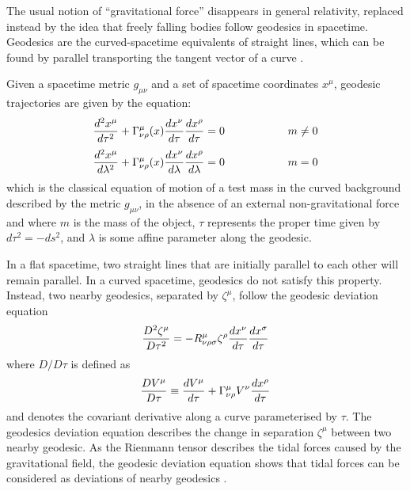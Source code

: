 \documentclass[binding=0.6cm, LaM]{sapthesis}
\begin{document}
	The usual notion of “gravitational force” disappears in general relativity, replaced instead 
	by the idea that freely falling bodies follow geodesics in spacetime.
	Geodesics are the curved-spacetime equivalents of straight lines, which can be found by 
	parallel transporting the tangent vector of a curve \cite{16}.

	Given a spacetime metric $g_{\mu\nu}$ and a set of spacetime coordinates $x^{\mu}$, 
	geodesic trajectories are given by the equation:
		\begin{equation}
			{{d^2x^{\mu}}\over{d\tau^2}} + \Gamma_{\nu\rho}^{\mu}(x){{dx^{\nu}}\over{d\tau}}{{dx^{\rho}}\over{d\tau}} = 0 \hspace*{2cm} m \neq 0
		\end{equation}
		\begin{equation}
			{{d^2x^{\mu}}\over{d\lambda^2}} + \Gamma_{\nu\rho}^{\mu}(x){{dx^{\nu}}\over{d\lambda}}{{dx^{\rho}}\over{d\lambda}} = 0 \hspace*{2cm} m = 0
		\end{equation}
	which is the classical equation of motion of a test mass in the curved background described 
	by the metric $g_{\mu\nu}$, in the absence of an external non-gravitational force and where $m$ is the mass
	of the object, $\tau$ represents the proper time given by $d\tau^2 = -ds^2$, 
	and $\lambda$ is some affine parameter along the geodesic.

	In a flat spacetime, two straight lines that are initially parallel to each other will remain parallel.
	In a curved spacetime, geodesics do not satisfy this property.
	Instead, two nearby geodesics, separated by $\zeta^{\mu}$, follow the geodesic deviation equation
		\begin{equation}
			{{D^2\zeta^{\mu}}\over{D\tau^2}} = -R^{\mu}_{\nu\rho\sigma}\zeta^{\rho}{{dx^{\nu}}\over{d\tau}}{{dx^{\sigma}}\over{d\tau}}
		\end{equation}
	where $D/D\tau$ is defined as
		\begin{equation}
			{{DV^{\mu}}\over{D\tau}} \equiv {{dV^{\mu}}\over{d\tau}} + \Gamma^{\mu}_{\nu\rho}V^{\nu}{{dx^{\rho}}\over{d\tau}}
		\end{equation}
	and denotes the covariant derivative along a curve parameterised by $\tau$. 
	The geodesics deviation equation describes the change in separation $\zeta^{\mu}$ between two nearby geodesic.
	As the Rienmann tensor describes the tidal forces caused by the gravitational field, 
	the geodesic deviation equation shows that tidal forces can be considered as deviations of nearby geodesics \cite{6}.
\end{document}
